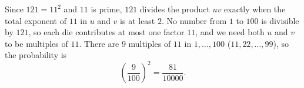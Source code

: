 Since $121=11^2$ and $11$ is prime, $121$ divides the product $uv$ exactly when the total exponent of $11$ in $u$ and $v$ is at least $2$. No number from $1$ to $100$ is divisible by $121$, so each die contributes at most one factor $11$, and we need both $u$ and $v$ to be multiples of $11$. There are $9$ multiples of $11$ in $1,\dots,100$ ($11,22,\dots,99$), so the probability is
\[\left(\dfrac{9}{100}\right)^2=\boxed{\dfrac{81}{10000}}.\]
